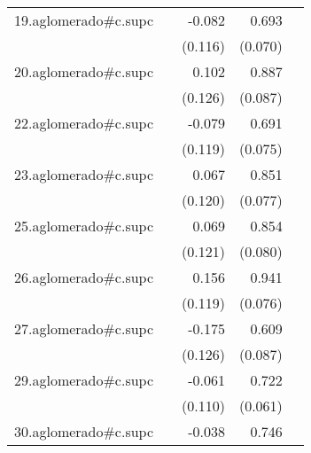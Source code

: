 {\begin{longtable}{l*{4}{D{.}{.}{-1}}}
\addlinespace
19.aglomerado#c.supc&                     &      -0.082         &       0.693\sym{***}&                     \\
            &                     &     (0.116)         &     (0.070)         &                     \\
\addlinespace
20.aglomerado#c.supc&                     &       0.102         &       0.887\sym{***}&                     \\
            &                     &     (0.126)         &     (0.087)         &                     \\
\addlinespace
22.aglomerado#c.supc&                     &      -0.079         &       0.691\sym{***}&                     \\
            &                     &     (0.119)         &     (0.075)         &                     \\
\addlinespace
23.aglomerado#c.supc&                     &       0.067         &       0.851\sym{***}&                     \\
            &                     &     (0.120)         &     (0.077)         &                     \\
\addlinespace
25.aglomerado#c.supc&                     &       0.069         &       0.854\sym{***}&                     \\
            &                     &     (0.121)         &     (0.080)         &                     \\
\addlinespace
26.aglomerado#c.supc&                     &       0.156         &       0.941\sym{***}&                     \\
            &                     &     (0.119)         &     (0.076)         &                     \\
\addlinespace
27.aglomerado#c.supc&                     &      -0.175         &       0.609\sym{***}&                     \\
            &                     &     (0.126)         &     (0.087)         &                     \\
\addlinespace
29.aglomerado#c.supc&                     &      -0.061         &       0.722\sym{***}&                     \\
            &                     &     (0.110)         &     (0.061)         &                     \\
\addlinespace
30.aglomerado#c.supc&                     &      -0.038         &       0.746\sym{***}&                     \\

\end{longtable}}
